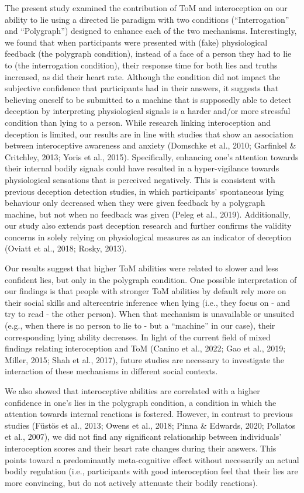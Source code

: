 \documentclass[
  man,mask,floatsintext]{apa6}
\begin{document}
The present study examined the contribution of ToM and interoception on our ability to lie using a directed lie paradigm with two conditions (``Interrogation'' and ``Polygraph'') designed to enhance each of the two mechanisms. Interestingly, we found that when participants were presented with (fake) physiological feedback (the polygraph condition), instead of a face of a person they had to lie to (the interrogation condition), their response time for both lies and truths increased, as did their heart rate. Although the condition did not impact the subjective confidence that participants had in their answers, it suggests that believing oneself to be submitted to a machine that is supposedly able to detect deception by interpreting physiological signals is a harder and/or more stressful condition than lying to a person. While research linking interoception and deception is limited, our results are in line with studies that show an association between interoceptive awareness and anxiety (Domschke et al., 2010; Garfinkel \& Critchley, 2013; Yoris et al., 2015). Specifically, enhancing one's attention towards their internal bodily signals could have resulted in a hyper-vigilance towards physiological sensations that is perceived negatively. This is consistent with previous deception detection studies, in which participants' spontaneous lying behaviour only decreased when they were given feedback by a polygraph machine, but not when no feedback was given (Peleg et al., 2019). Additionally, our study also extends past deception research and further confirms the validity concerns in solely relying on physiological measures as an indicator of deception (Oviatt et al., 2018; Rosky, 2013).

Our results suggest that higher ToM abilities were related to slower and less confident lies, but only in the polygraph condition. One possible interpretation of our findings is that people with stronger ToM abilities by default rely more on their social skills and altercentric inference when lying (i.e., they focus on - and try to read - the other person). When that mechanism is unavailable or unsuited (e.g., when there is no person to lie to - but a ``machine'' in our case), their corresponding lying ability decreases. In light of the current field of mixed findings relating interoception and ToM (Canino et al., 2022; Gao et al., 2019; Miller, 2015; Shah et al., 2017), future studies are necessary to investigate the interaction of these mechanisms in different social contexts.

We also showed that interoceptive abilities are correlated with a higher confidence in one's lies in the polygraph condition, a condition in which the attention towards internal reactions is fostered. However, in contrast to previous studies (Füstös et al., 2013; Owens et al., 2018; Pinna \& Edwards, 2020; Pollatos et al., 2007), we did not find any significant relationship between individuals' interoception scores and their heart rate changes during their answers. This points toward a predominantly meta-cognitive effect without necessarily an actual bodily regulation (i.e., participants with good interoception feel that their lies are more convincing, but do not actively attenuate their bodily reactions).
\end{document}
